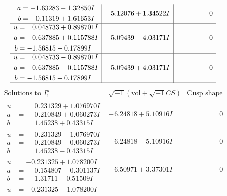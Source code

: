 \documentclass[1p]{elsarticle_modified}
\theoremstyle{definition}
\newcommand{\I}{\sqrt{-1}}
\begin{document}
$$\begin{array}{c|c|c}
\begin{aligned}
a &= -1.63283 - 1.32850 I \\
b &= -0.11319 + 1.61653 I\end{aligned}
 & \phantom{-}5.12076 + 1.34522 I & \phantom{-0.000000 } 0 \\ \hline\begin{aligned}
u &= \phantom{-}0.048733 + 0.898701 I \\
a &= -0.637885 + 0.115788 I \\
b &= -1.56815 - 0.17899 I\end{aligned}
 & -5.09439 - 4.03171 I & \phantom{-0.000000 } 0 \\ \hline\begin{aligned}
u &= \phantom{-}0.048733 - 0.898701 I \\
a &= -0.637885 - 0.115788 I \\
b &= -1.56815 + 0.17899 I\end{aligned}
 & -5.09439 + 4.03171 I & \phantom{-0.000000 } 0\\
 \hline 
 \end{array}$$\newpage$$\begin{array}{c|c|c}  
\text{Solutions to }I^u_{1}& \I (\text{vol} + \sqrt{-1}CS) & \text{Cusp shape}\\
 \hline 
\begin{aligned}
u &= \phantom{-}0.231329 + 1.076970 I \\
a &= \phantom{-}0.210849 + 0.060273 I \\
b &= \phantom{-}1.45238 + 0.43315 I\end{aligned}
 & -6.24818 + 5.10916 I & \phantom{-0.000000 } 0 \\ \hline\begin{aligned}
u &= \phantom{-}0.231329 - 1.076970 I \\
a &= \phantom{-}0.210849 - 0.060273 I \\
b &= \phantom{-}1.45238 - 0.43315 I\end{aligned}
 & -6.24818 - 5.10916 I & \phantom{-0.000000 } 0 \\ \hline\begin{aligned}
u &= -0.231325 + 1.078200 I \\
a &= \phantom{-}0.154807 - 0.301137 I \\
b &= \phantom{-}1.31711 - 0.51509 I\end{aligned}
 & -6.50971 + 3.37301 I & \phantom{-0.000000 } 0 \\ \hline\begin{aligned}
u &= -0.231325 - 1.078200 I \\

\end{aligned}
\end{array}$$
\end{document}
